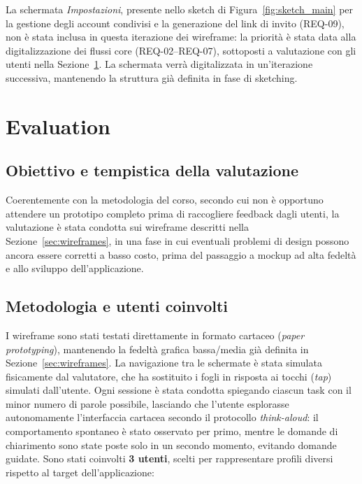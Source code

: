 \documentclass[11pt,a4paper]{article}
\begin{document}
La schermata \emph{Impostazioni}, presente nello sketch di Figura~\ref{fig:sketch_main} per la gestione degli account condivisi e la generazione del link di invito
(REQ-09), non è stata inclusa in questa iterazione dei wireframe: la priorità è stata data alla digitalizzazione dei flussi core (REQ-02--REQ-07),
sottoposti a valutazione con gli utenti nella Sezione~\ref{sec:evaluation}. La schermata verrà digitalizzata in un'iterazione successiva,
mantenendo la struttura già definita in fase di sketching.

\section{Evaluation}
\label{sec:evaluation}

\subsection{Obiettivo e tempistica della valutazione}
Coerentemente con la metodologia del corso, secondo cui non è opportuno attendere un prototipo completo prima di raccogliere feedback dagli utenti, la valutazione è stata condotta sui wireframe descritti nella Sezione~\ref{sec:wireframes}, in una fase in cui eventuali problemi di design possono ancora essere corretti a basso costo, prima del passaggio a mockup ad alta fedeltà e allo sviluppo dell'applicazione.

\subsection{Metodologia e utenti coinvolti}
\label{subsec:eval_metodologia}
I wireframe sono stati testati direttamente in formato cartaceo (\textit{paper prototyping}), mantenendo la fedeltà grafica bassa/media già definita in Sezione~\ref{sec:wireframes}. La navigazione tra le schermate è stata simulata fisicamente dal valutatore, che ha sostituito i fogli in risposta ai tocchi (\textit{tap}) simulati dall'utente. Ogni sessione è stata condotta spiegando ciascun task con il minor numero di parole possibile, lasciando che l'utente esplorasse autonomamente l'interfaccia cartacea secondo il protocollo \textit{think-aloud}: il comportamento spontaneo è stato osservato per primo, mentre le domande di chiarimento sono state poste solo in un secondo momento, evitando domande guidate.
\newline
Sono stati coinvolti \textbf{3 utenti}, scelti per rappresentare profili diversi rispetto al target dell'applicazione:
\end{document}
